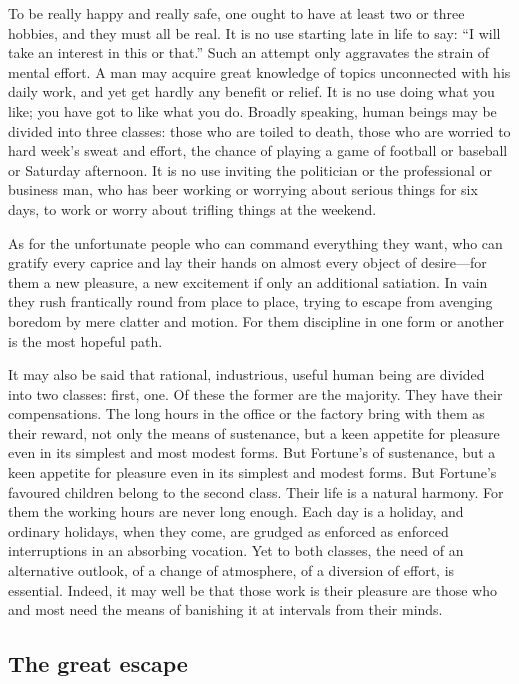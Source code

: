 \documentclass[11pt]{article}
\begin{document}
To be really happy and really safe, one ought to have at least two or three hobbies, and they must all be real. It is no use starting late in life to say: ``I will take an interest in this or that.'' Such an attempt only aggravates the strain of mental effort. A man may acquire great knowledge of topics unconnected with his daily work, and yet get hardly any benefit or relief. It is no use doing what you like; you have got to like what you do. Broadly speaking, human beings may be divided into three classes: those who are toiled to death, those who are worried to hard week's sweat and effort, the chance of playing a game of football or baseball or Saturday afternoon. It is no use inviting the politician or the professional or business man, who has beer working or worrying about serious things for six days, to work or worry about trifling things at the weekend.

As for the unfortunate people who can command everything they want, who can gratify every caprice and lay their hands on almost every object of desire---for them a new pleasure, a new excitement if only an additional satiation. In vain they rush frantically round from place to place, trying to escape from avenging boredom by mere clatter and motion. For them discipline in one form or another is the most hopeful path. 

It may also be said that rational, industrious, useful human being are divided into two classes: first, one. Of these the former are the majority. They have their compensations. The long hours in the office or the factory bring with them as their reward, not only the means of sustenance, but a keen appetite for pleasure even in its simplest and most modest forms. But Fortune's of sustenance, but a keen appetite for pleasure even in its simplest and modest forms. But Fortune's favoured children belong to the second class. Their life is a natural harmony. For them the working hours are never long enough. Each day is a holiday, and ordinary holidays, when they come, are grudged as enforced as enforced interruptions in an absorbing vocation. Yet to both classes, the need of an alternative outlook, of a change of atmosphere, of a diversion of effort, is essential. Indeed, it may well be that those work is their pleasure are those who and most need the means of banishing it at intervals from their minds.
\subsection{The great escape}
\label{sec-2-47}
\end{document}
